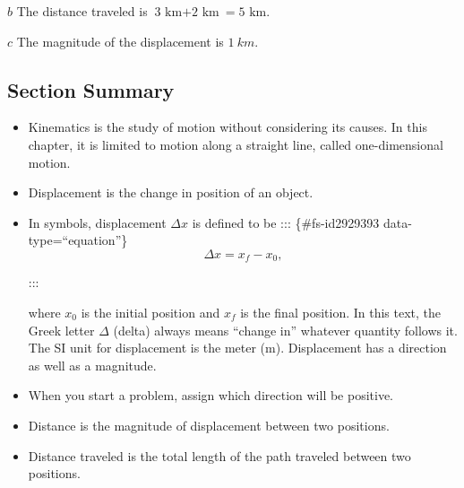 \documentclass[
]{book}
\begin{document}
\(b\) The distance traveled is
\({{\text{3\ km} + \text{2\ km}} = \text{5\ km}}{}\).

\(c\) The magnitude of the displacement is \(1\ km{}\).

\hypertarget{fs-id2758854-summary}{}
\hypertarget{section-summary}{%
\subsection{Section Summary}\label{section-summary}}

\begin{itemize}
\item
  Kinematics is the study of motion without considering its causes. In
  this chapter, it is limited to motion along a straight line, called
  one-dimensional motion.
\item
  Displacement is the change in position of an object.
\item
  In symbols, displacement \({\Delta x}{}\) is defined to be
  ::: \{\#fs-id2929393 data-type=``equation''\}
  \[{\Delta x = {x_{f} - x_{0}},}{}\]

  :::

  where \(x_{0}\) is the initial position and \(x_{f}{}\) is the final
  position. In this text, the Greek letter \(\Delta{}\) (delta) always
  means ``change in'' whatever quantity follows it. The SI unit for
  displacement is the meter (m). Displacement has a direction as well
  as a magnitude.
\item
  When you start a problem, assign which direction will be positive.
\item
  Distance is the magnitude of displacement between two positions.
\item
  Distance traveled is the total length of the path traveled between
  two positions.
\end{itemize}
\end{document}

